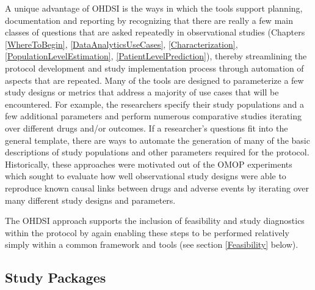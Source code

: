 \documentclass[11pt]{book}
\theoremstyle{definition}
\theoremstyle{definition}
\theoremstyle{definition}
\theoremstyle{remark}
\begin{document}
A unique advantage of OHDSI is the ways in which the tools support
planning, documentation and reporting by recognizing that there are
really a few main classes of questions that are asked repeatedly in
observational studies (Chapters \ref{WhereToBegin},
\ref{DataAnalyticsUseCases}, \ref{Characterization},
\ref{PopulationLevelEstimation}, \ref{PatientLevelPrediction}), thereby
streamlining the protocol development and study implementation process
through automation of aspects that are repeated. Many of the tools are
designed to parameterize a few study designs or metrics that address a
majority of use cases that will be encountered. For example, the
researchers specify their study populations and a few additional
parameters and perform numerous comparative studies iterating over
different drugs and/or outcomes. If a researcher's questions fit into
the general template, there are ways to automate the generation of many
of the basic descriptions of study populations and other parameters
required for the protocol. Historically, these approaches were motivated
out of the OMOP experiments which sought to evaluate how well
observational study designs were able to reproduce known causal links
between drugs and adverse events by iterating over many different study
designs and parameters.

The OHDSI approach supports the inclusion of feasibility and study
diagnostics within the protocol by again enabling these steps to be
performed relatively simply within a common framework and tools (see
section \ref{Feasibility} below).

\subsection{Study Packages}\label{study-packages}

\end{document}
